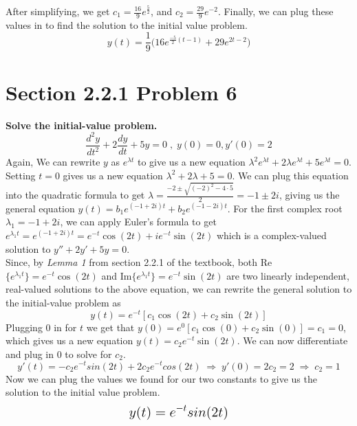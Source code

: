 \documentclass[11pt]{article}
\renewcommand{\l}{\lambda}
\begin{document}
After simplifying, we get $c_1 = \frac{16}{9}e^{\frac{5}{2}}$, and $c_2 = \frac{29}{9}e^{-2}$.  
Finally, we can plug these values in to find the solution to the initial value problem. 
$$y(t) = \frac{1}{9}\Big(16e^{\frac{-5}{2}(t-1)}+29e^{2t-2}\Big)$$
\newpage

 \section*{Section 2.2.1 Problem 6}
 \textbf{Solve the initial-value problem.}
 $$\frac{d^2y}{dt^2} + 2\frac{dy}{dt} + 5y = 0 \;,\; y(0) = 0, y'(0) = 2$$
 Again, We can rewrite $y$ as $e^{\l t}$ to give us a new equation 
 $\l^2 e^{\l t} + 2\l e^{\l t} + 5e^{\l t} = 0$.  Setting $t=0$ gives us a new equation 
 $\l^2 + 2\l + 5 = 0$.  We can plug this equation into the quadratic formula to get 
 $\l = \frac{-2 \pm \sqrt{(-2)^2 - 4 \cdot 5}}{2} = -1 \pm 2i$, giving us the general 
 equation $y(t) = b_1e^{(-1+2i)t} + b_2e^{(-1-2i)t}$.  For the first complex root $\l_1 = -1+2i$, 
 we can apply Euler's formula to get $e^{\l_1 t} = e^{(-1+2i)t} = e^{-t}\cos(2t) + ie^{-t}\sin(2t)$ 
 which is a complex-valued solution to $y'' + 2y' + 5y = 0$. \\
 
 Since, by \textit{Lemma 1} from section 2.2.1 of 
 the textbook, both Re$\{e^{\l_1 t}\} = e^{-t}\cos(2t)$ and Im$\{e^{\l_1 t}\} = e^{-t}\sin(2t)$ 
 are two linearly independent, real-valued solutions to the above equation, we can rewrite the general
 solution to the initial-value problem as 
 $$y(t) = e^{-t}[c_1\cos(2t) + c_2\sin(2t)]$$
 Plugging $0$ in for $t$ we get that $y(0) = e^0 [c_1\cos(0) + c_2\sin(0)] = c_1 = 0$, which gives us 
 a new equation $y(t) = c_2e^{-t}\sin(2t)$.  We can now differentiate and plug in 0 to solve for $c_2$. 
 $$y'(t) = -c_2e^{-t}sin(2t) + 2c_2e^{-t}cos(2t) \;\Rightarrow\; y'(0) = 2c_2 = 2 \;\Rightarrow\; 
 c_2 = 1$$
 Now we can plug the values we found for our two constants to give us the solution to the initial 
 value problem. 
 $$\mathlarger{\mathlarger{y(t) = e^{-t}sin(2t)}}$$
 
 \newpage
\end{document}
